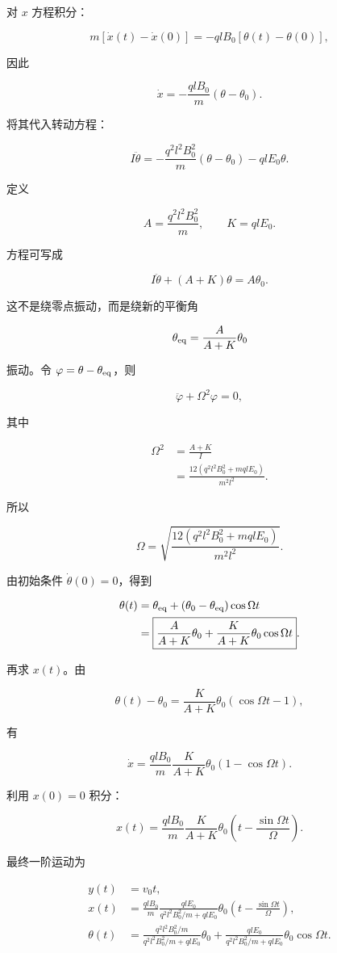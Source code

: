 \documentclass[12pt,a4paper,UTF8]{ctexart}
\begin{document}
对 \(x\) 方程积分：

\[m[\dot x(t)-\dot x(0)]
=-qlB_0[\theta(t)-\theta(0)],\]

因此

\[\boxed{\dot x=-\frac{qlB_0}{m}(\theta-\theta_0)}.\]

将其代入转动方程：

\[I\ddot\theta
=-\frac{q^2l^2B_0^2}{m}(\theta-\theta_0)-qlE_0\theta.\]

定义

\[A=\frac{q^2l^2B_0^2}{m},\qquad K=qlE_0.\]

方程可写成

\[I\ddot\theta+(A+K)\theta=A\theta_0.\]

这不是绕零点振动，而是绕新的平衡角

\[\theta_{\rm eq}=\frac{A}{A+K}\theta_0\]

振动。令 \(\varphi=\theta-\theta_{\rm eq}\)，则

\[\ddot\varphi+\Omega^2\varphi=0,\]

其中

\[
\begin{aligned}
\Omega^2&=\frac{A+K}{I}\\
&=\frac{12(q^2l^2B_0^2+mqlE_0)}{m^2l^2}.
\end{aligned}
\]

所以

\[\boxed{\Omega=\sqrt{\frac{12(q^2l^2B_0^2+mqlE_0)}{m^2l^2}}}.\]

由初始条件 \(\dot\theta(0)=0\)，得到

\[
\begin{aligned}
\theta(t)
&=\theta_{\rm eq}+(\theta_0-\theta_{\rm eq})\cos\Omega t\\
&=\boxed{\frac{A}{A+K}\theta_0+
\frac{K}{A+K}\theta_0\cos\Omega t}.
\end{aligned}
\]

再求 \(x(t)\)。由

\[\theta(t)-\theta_0
=\frac{K}{A+K}\theta_0(\cos\Omega t-1),\]

有

\[\dot x=\frac{qlB_0}{m}\frac{K}{A+K}\theta_0(1-\cos\Omega t).\]

利用 \(x(0)=0\) 积分：

\[
\boxed{x(t)=\frac{qlB_0}{m}\frac{K}{A+K}\theta_0
\left(t-\frac{\sin\Omega t}{\Omega}\right)}.
\]

最终一阶运动为

\[
\boxed{
\begin{aligned}
y(t)&=v_0t,\\
x(t)&=\frac{qlB_0}{m}\frac{qlE_0}{q^2l^2B_0^2/m+qlE_0}\theta_0
\left(t-\frac{\sin\Omega t}{\Omega}\right),\\
\theta(t)&=\frac{q^2l^2B_0^2/m}{q^2l^2B_0^2/m+qlE_0}\theta_0
+\frac{qlE_0}{q^2l^2B_0^2/m+qlE_0}\theta_0\cos\Omega t.
\end{aligned}}
\]
\end{document}
